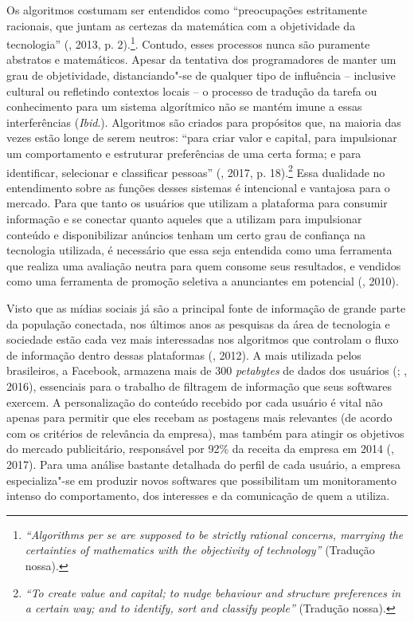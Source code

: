 Os algoritmos costumam ser entendidos como ``preocupações estritamente
racionais, que juntam as certezas da matemática com a objetividade da
tecnologia'' (, 2013, p. 2).\footnote{\emph{``Algorithms per se are supposed to be strictly
  rational concerns, marrying the certainties of mathematics with the
  objectivity of technology''} (Tradução nossa).}.
Contudo, esses processos nunca são puramente abstratos e matemáticos.
Apesar da tentativa dos programadores de manter um grau de objetividade,
distanciando"-se de qualquer tipo de influência -- inclusive cultural ou
refletindo contextos locais -- o processo de tradução da tarefa ou
conhecimento para um sistema algorítmico não se mantém imune a essas
interferências (\emph{Ibid}.). Algoritmos são criados para propósitos que, na
maioria das vezes estão longe de serem neutros: ``para criar valor e
capital, para impulsionar um comportamento e estruturar preferências de
uma certa forma; e para identificar, selecionar e classificar
pessoas'' (, 2017, p. 18).\footnote{\emph{``To create value and capital; to nudge behaviour and structure preferences in a certain way; and to identify, sort and classify people''} (Tradução nossa).} Essa dualidade no
entendimento sobre as funções desses sistemas é intencional e vantajosa
para o mercado. Para que tanto os usuários que utilizam a plataforma
para consumir informação e se conectar quanto aqueles que a utilizam
para impulsionar conteúdo e disponibilizar anúncios tenham um certo grau
de confiança na tecnologia utilizada, é necessário que essa seja
entendida como uma ferramenta que realiza uma avaliação neutra para quem
consome seus resultados, e vendidos como uma ferramenta de promoção
seletiva a anunciantes em potencial (, 2010).

Visto que as mídias sociais já são a principal fonte de informação de
grande parte da população conectada, nos últimos anos as pesquisas da
área de tecnologia e sociedade estão cada vez mais interessadas nos
algoritmos que controlam o fluxo de informação dentro dessas plataformas
(, 2012). A mais utilizada pelos brasileiros, a Facebook,
armazena mais de 300 \emph{petabytes} de dados dos usuários
(; , 2016), essenciais para o trabalho de filtragem de informação que seus softwares exercem. A personalização do conteúdo recebido por cada usuário é vital
não apenas para permitir que eles recebam as postagens mais relevantes
(de acordo com os critérios de relevância da empresa), mas também para
atingir os objetivos do mercado publicitário, responsável por 92\% da
receita da empresa em 2014 (, 2017). Para uma análise bastante
detalhada do perfil de cada usuário, a empresa especializa"-se em
produzir novos softwares que possibilitam um monitoramento intenso do
comportamento, dos interesses e da comunicação de quem a utiliza.


